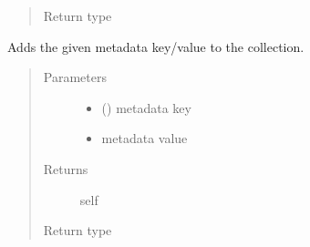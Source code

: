 \documentclass[letterpaper,10pt,english]{sphinxmanual}
\begin{document}
\begin{fulllineitems}
\begin{fulllineitems}
\begin{quote}
\begin{description}
\item[{Return type}] \leavevmode
{\hyperref[\detokenize{autoapi/pine/client/models/index:pine.client.models.CollectionBuilder}]{}}

\end{description}\end{quote}

\end{fulllineitems}


\begin{fulllineitems}
\label{\detokenize{autoapi/pine/client/models/index:pine.client.models.CollectionBuilder.metadata}}
Adds the given metadata key/value to the collection.
\begin{quote}\begin{description}
\item[{Parameters}] \leavevmode\begin{itemize}
\item {} 
 () \textendash{} metadata key

\item {} 
 \textendash{} metadata value

\end{itemize}

\item[{Returns}] \leavevmode
self

\item[{Return type}] \leavevmode
{\hyperref[\detokenize{autoapi/pine/client/models/index:pine.client.models.CollectionBuilder}]{}}

\end{description}\end{quote}

\end{fulllineitems}



\end{fulllineitems}
\end{document}
